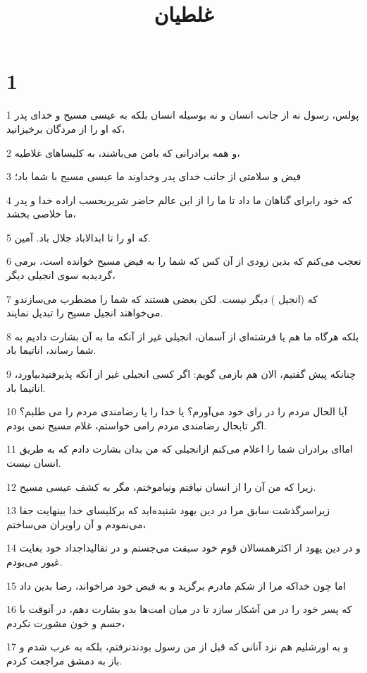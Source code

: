 

\title{غلطيان}


\chapter{1}

\par 1 پولس، رسول نه از جانب انسان و نه بوسیله انسان بلکه به عیسی مسیح و خدای پدر که او را از مردگان برخیزانید،
\par 2 و همه برادرانی که بامن می‌باشند، به کلیساهای غلاطیه،
\par 3 فیض و سلامتی از جانب خدای پدر وخداوند ما عیسی مسیح با شما باد؛
\par 4 که خود رابرای گناهان ما داد تا ما را از این عالم حاضر شریربحسب اراده خدا و پدر ما خلاصی بخشد،
\par 5 که او را تا ابدالاباد جلال باد. آمین.
\par 6 تعجب می‌کنم که بدین زودی از آن کس که شما را به فیض مسیح خوانده است، برمی گردیدبه سوی انجیلی دیگر،
\par 7 که (انجیل ) دیگر نیست. لکن بعضی هستند که شما را مضطرب می‌سازندو می‌خواهند انجیل مسیح را تبدیل نمایند.
\par 8 بلکه هرگاه ما هم یا فرشته‌ای از آسمان، انجیلی غیر از آنکه ما به آن بشارت دادیم به شما رساند، اناتیما باد.
\par 9 چنانکه پیش گفتیم، الان هم بازمی گویم: اگر کسی انجیلی غیر از آنکه پذیرفتیدبیاورد، اناتیما باد.
\par 10 آیا الحال مردم را در رای خود می‌آورم؟ یا خدا را یا رضامندی مردم را می طلبم؟ اگر تابحال رضامندی مردم رامی خواستم، غلام مسیح نمی بودم.
\par 11 اما‌ای برادران شما را اعلام می‌کنم ازانجیلی که من بدان بشارت دادم که به طریق انسان نیست.
\par 12 زیرا که من آن را از انسان نیافتم ونیاموختم، مگر به کشف عیسی مسیح.
\par 13 زیراسرگذشت سابق مرا در دین یهود شنیده‌اید که برکلیسای خدا بینهایت جفا می‌نمودم و آن راویران می‌ساختم،
\par 14 و در دین یهود از اکثرهمسالان قوم خود سبقت می‌جستم و در تقالیداجداد خود بغایت غیور می‌بودم.
\par 15 اما چون خداکه مرا از شکم مادرم برگزید و به فیض خود مراخواند، رضا بدین داد
\par 16 که پسر خود را در من آشکار سازد تا در میان امت‌ها بدو بشارت دهم، در آنوقت با جسم و خون مشورت نکردم،
\par 17 و به اورشلیم هم نزد آنانی که قبل از من رسول بودندنرفتم، بلکه به عرب شدم و باز به دمشق مراجعت کردم.
